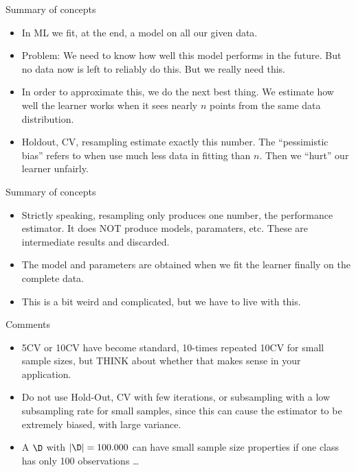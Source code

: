\begin{frame}{Summary of concepts}

\begin{itemize}
\item
  In ML we fit, at the end, a model on all our given data.
\item
  Problem: We need to know how well this model performs in the future.
  But no data now is left to reliably do this. But we really need this.
\item
  In order to approximate this, we do the next best thing. We estimate
  how well the learner works when it sees nearly \(n\) points from the
  same data distribution.
\item
  Holdout, CV, resampling estimate exactly this number. The
  \enquote{pessimistic bias} refers to when use much less data in
  fitting than \(n\). Then we \enquote{hurt} our learner unfairly.
\end{itemize}

\end{frame}

\begin{frame}{Summary of concepts}

\begin{itemize}
\item
  Strictly speaking, resampling only produces one number, the
  performance estimator. It does NOT produce models, paramaters, etc.
  These are intermediate results and discarded.
\item
  The model and parameters are obtained when we fit the learner finally
  on the complete data.
\item
  This is a bit weird and complicated, but we have to live with this.
\end{itemize}

\end{frame}

\begin{frame}{Comments}

\begin{itemize}
\item
  5CV or 10CV have become standard, 10-times repeated 10CV for small
  sample sizes, but THINK about whether that makes sense in your
  application.
\item
  Do not use Hold-Out, CV with few iterations, or subsampling with a low
  subsampling rate for small samples, since this can cause the estimator
  to be extremely biased, with large variance.
\item
  A \(\D\) with \(|\D| = 100.000\) can have small sample size properties
  if one class has only 100 observations \ldots
\end{itemize}

\end{frame}


